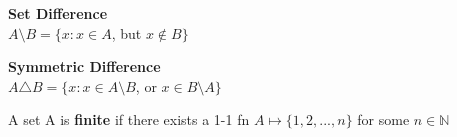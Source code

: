 \documentclass[12pt, oneside, letterpaper]{notes}
\begin{document}
\begin{mydef}
  \textbf{Set Difference}\\
  \indent $A \setminus B = \{x: x \in A$, but $x \notin B \}$
\end{mydef}

\begin{mydef}
  \textbf{Symmetric Difference}\\
  \indent $A \triangle B = \{x: x \in A \setminus B$, or 
  $x \in B \setminus A \}$
\end{mydef}

\begin{mydef}
  A set A is \textbf{finite} if there exists a 1-1 fn $A \mapsto 
  \{ 1, 2, ..., n \}$ for some $n \in \mathbb{N}$
\end{mydef}
\end{document}

